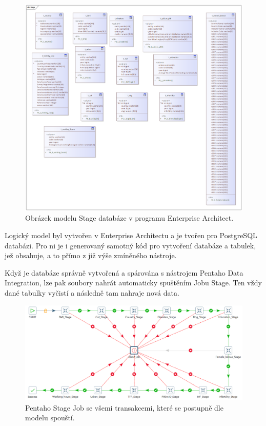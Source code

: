 \documentclass[thesis=M,czech]{FITthesis}[2022/10/08]
\begin{document}
\begin{figure}
    \centering
    \includegraphics[width=\textwidth]{DP-obrazky/Stage.png}
    \caption{Obrázek modelu Stage databáze v programu Enterprise Architect.}
    \label{fig:Stage_model}
\end{figure}

Logický model byl vytvořen v Enterprise Architectu a je tvořen pro PostgreSQL databázi. Pro ni je i generovaný samotný kód pro vytvoření databáze a tabulek, jež obsahuje, a to přímo z již výše zmíněného nástroje.

Když je databáze správně vytvořená a spárována s nástrojem Pentaho Data Integration, lze pak soubory nahrát automaticky spuštěním Jobu Stage. Ten vždy dané tabulky vyčistí a následně tam nahraje nová data.

\begin{figure}
    \centering
    \includegraphics[width=\textwidth]{DP-obrazky/Stage_Pentaho.png}
    \caption{Pentaho Stage Job se všemi transakcemi, které se postupně dle modelu spouští.}
    \label{fig:Stage_ETL}
\end{figure}
\end{document}
